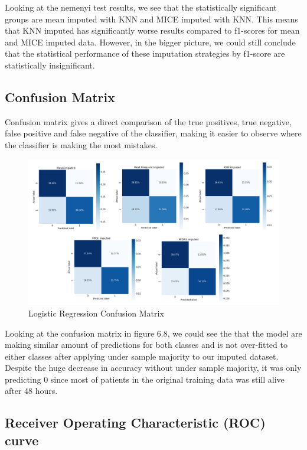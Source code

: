 \documentclass{l4proj}
\begin{document}
Looking at the nemenyi test results, we see that the statistically significant groups are mean imputed with KNN and MICE imputed with KNN. This means that KNN imputed has significantly worse results compared to f1-scores for mean and MICE imputed data. However, in the bigger picture, we could still conclude that the statistical performance of these imputation strategies by f1-score are statistically insignificant.


\subsection{Confusion Matrix}
Confusion matrix gives a direct comparison of the true positives, true negative, false positive and false negative of the classifier, making it easier to observe where the classifier is making the most mistakes.

\begin{figure}[!htb]
  \caption{Logistic Regression Confusion Matrix}
  \includegraphics[width=\textwidth]{dissertation/Latex/images/Classification Results/lg_cm.PNG}
\end{figure}

 Looking at the confusion matrix in figure 6.8, we could see the that the model are making similar amount of predictions for both classes and is not over-fitted to either classes after applying under sample majority to our imputed dataset. Despite the huge decrease in accuracy without under sample majority, it was only predicting 0 since most of patients in the original training data was still alive after 48 hours. 

\subsection{Receiver Operating Characteristic (ROC) curve}
\end{document}
